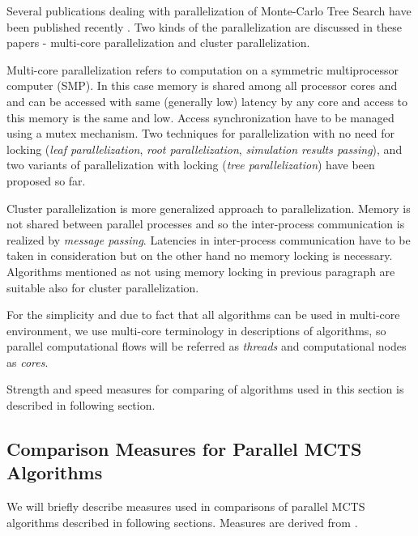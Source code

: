 Several publications dealing with parallelization of Monte-Carlo Tree Search have been published
recently \cites{Cazenave2007}{Chaslot2008}{Teytaud2008}. Two kinds of the parallelization are
discussed in these papers - multi-core parallelization and cluster parallelization.

Multi-core parallelization refers to computation on a symmetric multiprocessor computer (SMP). In
this case memory is shared among all processor cores and and can be accessed with same
(generally low) latency by any core  and access to this memory is the same and low.
Access synchronization have to be managed using a mutex mechanism. Two techniques for
parallelization with no need for locking (\emph{leaf parallelization}, \emph{root parallelization},
\emph{simulation results passing}),
and two variants of parallelization with locking (\emph{tree parallelization}) have been proposed so
far. 

Cluster parallelization is more generalized approach to parallelization. Memory is not shared
between parallel processes and so the inter-process communication is realized by \emph{message
passing}. Latencies in inter-process communication have to be taken in consideration but on the
other hand no memory locking is necessary. Algorithms mentioned as not using memory locking in
previous paragraph are suitable also for cluster parallelization.

For the simplicity and due to fact that all algorithms can be used in multi-core environment, we 
use multi-core terminology in descriptions of algorithms, so parallel
computational flows will be referred as \emph{threads} and computational nodes as \emph{cores}.

Strength and speed measures for comparing of algorithms used in this section is described in
following section.

\subsection{Comparison Measures for Parallel MCTS Algorithms}
\label{sec_measures_parallel}

We will briefly describe measures used in comparisons of parallel MCTS algorithms described in
following sections. Measures are derived from \cite{Chaslot2008}.

